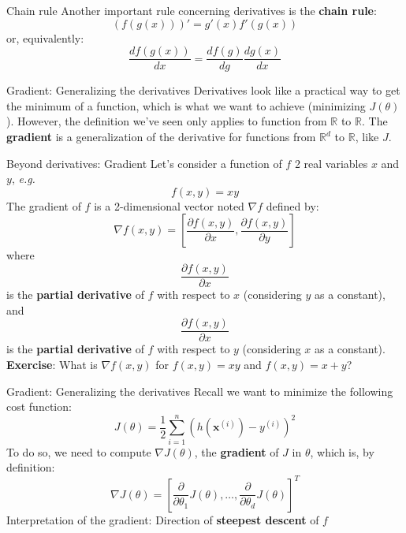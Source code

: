 \documentclass{beamer}
\newcommand{\real}{\mathbb{R}}
\newcommand{\bxi}{\bm{x}^{(i)}}
\newcommand{\yi}{y^{(i)}}
\newcommand{\1}[1]{\mathbbm{1}\left[#1\right]}
\begin{document}
\begin{frame}{Chain rule}
Another important rule concerning derivatives is the \textbf{chain rule}:
\begin{equation}
	(f(g(x)))' = g'(x) f'(g(x))
\end{equation}
or, equivalently:
\begin{equation}
	\dfrac{df(g(x))}{dx} = \dfrac{df(g)}{dg} \dfrac{dg(x)}{dx}
\end{equation}
\end{frame}

\begin{frame}{Gradient: Generalizing the derivatives}
Derivatives look like a practical way to get the minimum of a function, which is what we want to achieve (minimizing $J(\theta)$).
\vfill
\pause
However, the definition we've seen only applies to function from $\real$ to $\real$. The \textbf{gradient} is a generalization of the derivative for functions from $\real^d$ to $\real$, like $J$.
\end{frame}

\begin{frame}{Beyond derivatives: Gradient}
Let's consider a function of $f$ 2 real variables $x$ and $y$, \textit{e.g.}
\begin{equation*}
f(x, y) = xy
\end{equation*}
The gradient of $f$ is a 2-dimensional vector noted $\nabla f$ defined by:
\begin{equation*}
\nabla f(x, y) = \left[ \dfrac{\partial f(x, y)}{\partial x}, \dfrac{\partial f(x, y)}{\partial y} \right]
\end{equation*}
where 
$$\dfrac{\partial f(x, y)}{\partial x}$$ 
is the \textbf{partial derivative} of $f$ with respect to $x$ (considering $y$ as a constant), and 
$$\dfrac{\partial f(x, y)}{\partial x}$$ 
is the \textbf{partial derivative} of $f$ with respect to $y$ (considering $x$ as a constant).
\vfill
\pause
\textbf{Exercise}: What is $\nabla f(x, y)$ for $f(x, y) = xy$ and $f(x, y) = x + y$?
\end{frame}

\begin{frame}{Gradient: Generalizing the derivatives}
Recall we want to minimize the following cost function:
\begin{equation*}
J(\theta) = \dfrac{1}{2} \sum_{i = 1}^{n} \left( h\left(\bxi\right) - \yi \right)^2
\end{equation*}
\pause
\vfill
To do so, we need to compute $\nabla J(\theta)$, the \textbf{gradient} of $J$ in $\theta$, which is, by definition:
\begin{equation*}
\nabla J(\theta) = \left[ \dfrac{\partial}{\partial \theta_1} J(\theta), \dots, \dfrac{\partial}{\partial \theta_d} J(\theta) \right]^T
\end{equation*}
\vfill
\pause
Interpretation of the gradient: Direction of \textbf{steepest descent} of $f$
\end{frame}
\end{document}
